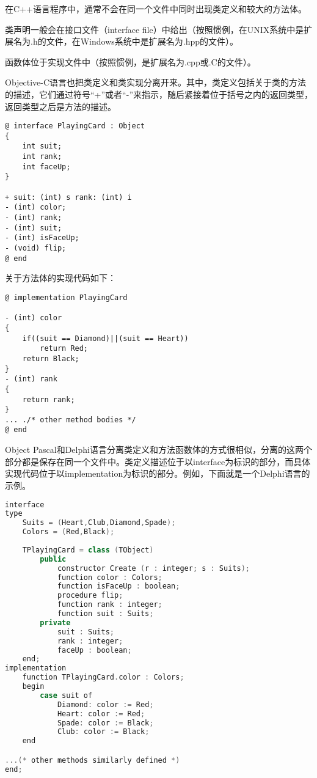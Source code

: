 在C++语言程序中，通常不会在同一个文件中同时出现类定义和较大的方法体。

\begin{compactitem}
\item 类声明一般会在接口文件（interface file）中给出（按照惯例，在UNIX系统中是扩展名为.h的文件，在Windows系统中是扩展名为.hpp的文件）。
\item 函数体位于实现文件中（按照惯例，是扩展名为.cpp或.C的文件）。
\end{compactitem}

Objective-C语言也把类定义和类实现分离开来。其中，类定义包括关于类的方法的描述，它们通过符号“+”或者“-”来指示，随后紧接着位于括号之内的返回类型，返回类型之后是方法的描述。

\begin{lstlisting}[language={[Objective]C}]
@ interface PlayingCard : Object
{
	int suit;
	int rank;
	int faceUp;
}
	
+ suit: (int) s rank: (int) i
- (int) color;
- (int) rank;
- (int) suit;
- (int) isFaceUp;
- (void) flip;
@ end
\end{lstlisting}


关于方法体的实现代码如下：



\begin{lstlisting}[language={[Objective]C}]
@ implementation PlayingCard
	
- (int) color
{
	if((suit == Diamond)||(suit == Heart))
		return Red;
	return Black;
}
- (int) rank
{
	return rank;
}
... ./* other method bodies */
@ end
\end{lstlisting}



Object Pascal和Delphi语言分离类定义和方法函数体的方式很相似，分离的这两个部分都是保存在同一个文件中。类定义描述位于以interface为标识的部分，而具体实现代码位于以implementation为标识的部分。例如，下面就是一个Delphi语言的示例。


\begin{lstlisting}[language=C++]
interface
type
	Suits = (Heart,Club,Diamond,Spade);
	Colors = (Red,Black);
	
	TPlayingCard = class (TObject)
		public
			constructor Create (r : integer; s : Suits);
			function color : Colors;
			function isFaceUp : boolean;
			procedure flip;
			function rank : integer;
			function suit : Suits;
		private
			suit : Suits;
			rank : integer;
			faceUp : boolean;
	end;	
implementation
	function TPlayingCard.color : Colors;
	begin
		case suit of
			Diamond: color := Red;	
			Heart: color := Red;
			Spade: color := Black;
			Club: color := Black;
	end

...(* other methods similarly defined *)
end;
\end{lstlisting}




